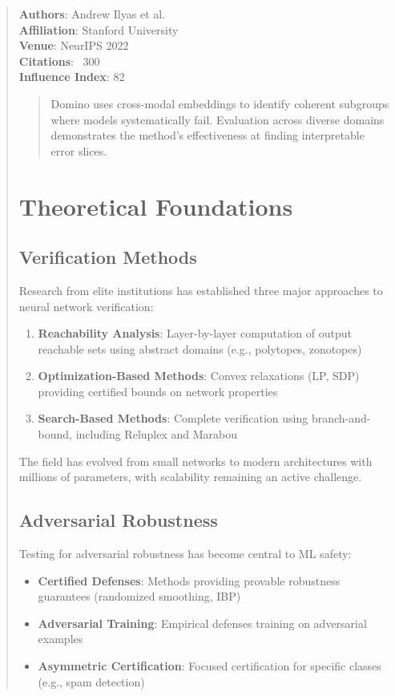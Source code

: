 \documentclass[12pt,a4paper]{article}
\begin{document}
\begin{abstract}
\textbf{Authors}: Andrew Ilyas et al. \\
\textbf{Affiliation}: Stanford University \\
\textbf{Venue}: NeurIPS 2022 \\
\textbf{Citations}: ~300 \\
\textbf{Influence Index}: 82

\begin{abstract}
Domino uses cross-modal embeddings to identify coherent subgroups where models systematically fail. Evaluation across diverse domains demonstrates the method's effectiveness at finding interpretable error slices.
\end{abstract}

\section{Theoretical Foundations}

\subsection{Verification Methods}

Research from elite institutions has established three major approaches to neural network verification:

\begin{enumerate}
    \item \textbf{Reachability Analysis}: Layer-by-layer computation of output reachable sets using abstract domains (e.g., polytopes, zonotopes)
    \item \textbf{Optimization-Based Methods}: Convex relaxations (LP, SDP) providing certified bounds on network properties
    \item \textbf{Search-Based Methods}: Complete verification using branch-and-bound, including Reluplex and Marabou
\end{enumerate}

The field has evolved from small networks to modern architectures with millions of parameters, with scalability remaining an active challenge.

\subsection{Adversarial Robustness}

Testing for adversarial robustness has become central to ML safety:

\begin{itemize}
    \item \textbf{Certified Defenses}: Methods providing provable robustness guarantees (randomized smoothing, IBP)
    \item \textbf{Adversarial Training}: Empirical defenses training on adversarial examples
    \item \textbf{Asymmetric Certification}: Focused certification for specific classes (e.g., spam detection)
\end{itemize}


\end{abstract}
\end{document}
